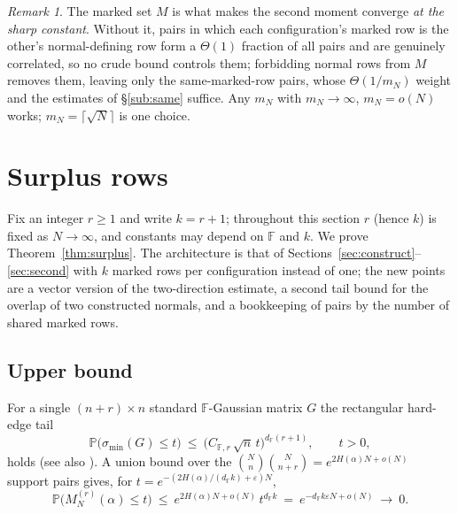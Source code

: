 \documentclass[11pt,reqno]{amsart}
\theoremstyle{plain}
\theoremstyle{definition}
\theoremstyle{remark}
\newtheorem{remark}[theorem]{Remark}
\newcommand{\F}{\mathbb{F}}
\newcommand{\PP}{\mathbb{P}}
\newcommand{\smin}{\sigma_{\min}}
\newcommand{\dF}{d_{\F}}
\begin{document}
\begin{remark}
The marked set $M$ is what makes the second moment converge \emph{at the sharp constant}. Without it,
pairs in which each configuration's marked row is the other's normal-defining row form a $\Theta(1)$
fraction of all pairs and are genuinely correlated, so no crude bound controls them; forbidding
normal rows from $M$ removes them, leaving only the same-marked-row pairs, whose $\Theta(1/m_N)$
weight and the estimates of \S\ref{sub:same} suffice. Any $m_N$ with $m_N\to\infty$, $m_N=o(N)$
works; $m_N=\lceil\sqrt N\rceil$ is one choice.
\end{remark}

\section{Surplus rows}\label{sec:surplus}
Fix an integer $r\ge1$ and write $k=r+1$; throughout this section $r$ (hence $k$) is fixed as
$N\to\infty$, and constants may depend on $\F$ and $k$. We prove Theorem~\ref{thm:surplus}. The
architecture is that of Sections~\ref{sec:construct}--\ref{sec:second} with $k$ marked rows per
configuration instead of one; the new points are a vector version of the two-direction estimate, a
second tail bound for the overlap of two constructed normals, and a bookkeeping of pairs by the
number of shared marked rows.

\subsection{Upper bound}
For a single $(n+r)\times n$ standard $\F$-Gaussian matrix $G$ the rectangular hard-edge tail
\begin{equation}\label{eq:recttail}
  \PP\bigl(\smin(G)\le t\bigr)\ \le\ \bigl(C_{\F,r}\,\sqrt n\,t\bigr)^{\dF(r+1)},\qquad t>0,
\end{equation}
holds \cite[Lemma 2.2]{shmalo} (see also \cite{rv}). A union bound over the
$\binom Nn\binom N{n+r}=e^{2H(\alpha)N+o(N)}$ support pairs gives, for
$t=e^{-(2H(\alpha)/(\dF k)+\varepsilon)N}$,
\[
  \PP\bigl(M_N^{(r)}(\alpha)\le t\bigr)\ \le\ e^{2H(\alpha)N+o(N)}\,t^{\dF k}
  \ =\ e^{-\dF k\varepsilon N+o(N)}\ \to\ 0 .
\]
\end{document}
